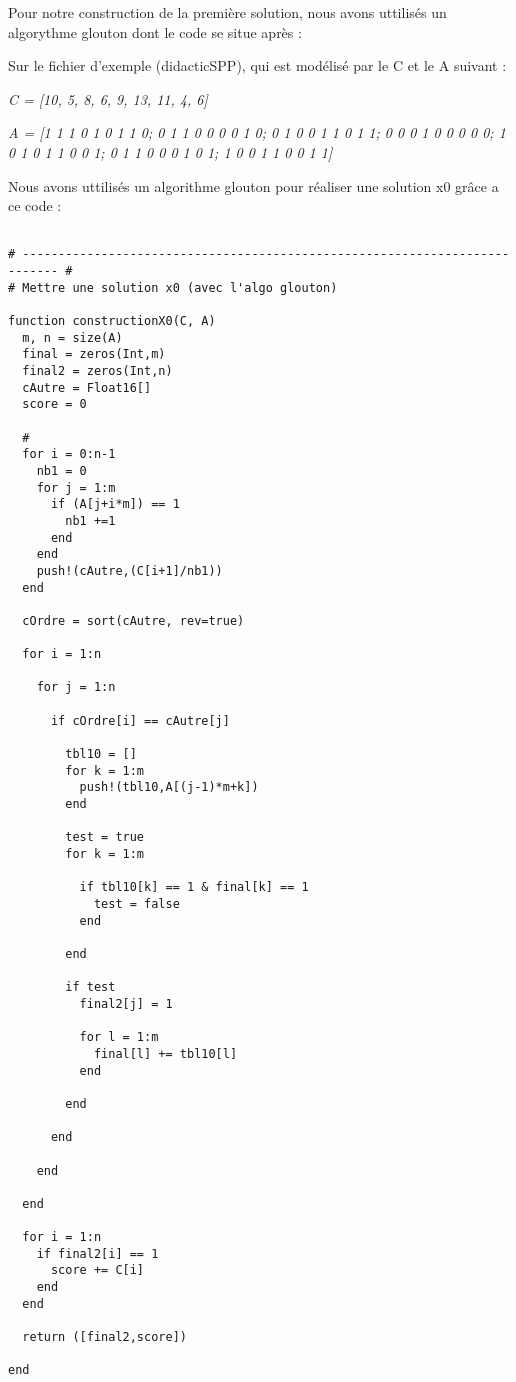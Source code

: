 \vspace{5mm}
\noindent
{}
\vspace{2mm}

\noindent
Pour notre construction de la première solution, nous avons uttilisés un algorythme glouton dont le code se situe après :

\vspace{5mm}
\noindent
Sur le fichier d'exemple (didacticSPP), qui est modélisé par le C et le A suivant :

\textit{C = [10, 5, 8, 6, 9, 13, 11, 4, 6]}

\textit{A = [1 1 1 0 1 0 1 1 0;
0 1 1 0 0 0 0 1 0;
0 1 0 0 1 1 0 1 1; 
0 0 0 1 0 0 0 0 0; 
1 0 1 0 1 1 0 0 1; 
0 1 1 0 0 0 1 0 1; 
1 0 0 1 1 0 0 1 1]}

\vspace{5mm}
\noindent
Nous avons uttilisés un algorithme glouton pour réaliser une solution x0 grâce a ce code :

\begin{lstlisting}

# --------------------------------------------------------------------------- #
# Mettre une solution x0 (avec l'algo glouton)

function constructionX0(C, A)
  m, n = size(A)
  final = zeros(Int,m)
  final2 = zeros(Int,n)
  cAutre = Float16[]
  score = 0

  #
  for i = 0:n-1
    nb1 = 0
    for j = 1:m
      if (A[j+i*m]) == 1
        nb1 +=1
      end
    end
    push!(cAutre,(C[i+1]/nb1))
  end

  cOrdre = sort(cAutre, rev=true)

  for i = 1:n

    for j = 1:n

      if cOrdre[i] == cAutre[j]

        tbl10 = []
        for k = 1:m
          push!(tbl10,A[(j-1)*m+k])
        end
        
        test = true
        for k = 1:m

          if tbl10[k] == 1 & final[k] == 1
            test = false
          end

        end

        if test
          final2[j] = 1

          for l = 1:m
            final[l] += tbl10[l]
          end

        end

      end

    end

  end

  for i = 1:n
    if final2[i] == 1
      score += C[i]
    end
  end

  return ([final2,score])

end
\end{lstlisting}

